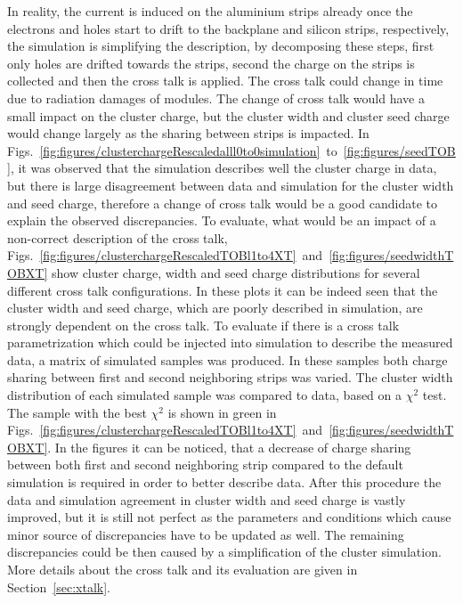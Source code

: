 In reality, the current is induced on the aluminium strips already once the electrons and holes start to drift to the backplane and silicon strips, respectively, the simulation is simplifying the description, by decomposing these steps, first only holes are drifted towards the strips, second the charge on the strips is collected and then the cross talk is applied. The cross talk could change in time due to radiation damages of modules. The change of cross talk would have a small impact on the cluster charge, but the cluster width and cluster seed charge would change largely as the sharing between strips is impacted. In Figs.~\ref{fig:figures/clusterchargeRescaledalll0to0simulation}~to~\ref{fig:figures/seedTOB}, it was observed that the simulation describes well the cluster charge in data, but there is large disagreement between data and simulation for the cluster width and seed charge, therefore a change of cross talk would be a good candidate to explain the observed discrepancies.  To evaluate, what would be an impact of a non-correct description of the cross talk, Figs.~\ref{fig:figures/clusterchargeRescaledTOBl1to4XT}~and~\ref{fig:figures/seedwidthTOBXT} show cluster charge, width and seed charge distributions for several different cross talk configurations. In these plots it can be indeed seen that the cluster width and seed charge, which are poorly described in simulation, are strongly dependent on the cross talk. To evaluate if there is a cross talk parametrization which could be injected into simulation to describe the measured data, a matrix of simulated samples was produced. In these samples both charge sharing between first and second neighboring strips was varied. The cluster width distribution of each simulated sample was compared to data, based on a $\chi^{2}$ test. The sample with the best $\chi^{2}$ is shown in green in Figs.~\ref{fig:figures/clusterchargeRescaledTOBl1to4XT}~and~\ref{fig:figures/seedwidthTOBXT}. In the figures it can be noticed, that a decrease of charge sharing between both first and second neighboring strip compared to the default simulation is required in order to better describe data. After this procedure the data and simulation agreement in cluster width and seed charge is vastly improved, but it is still not perfect as the parameters and conditions which cause minor source of discrepancies have to be updated as well. The remaining discrepancies could be then caused by a simplification of the cluster simulation. More details about the cross talk and its evaluation are given in Section~\ref{sec:xtalk}.


